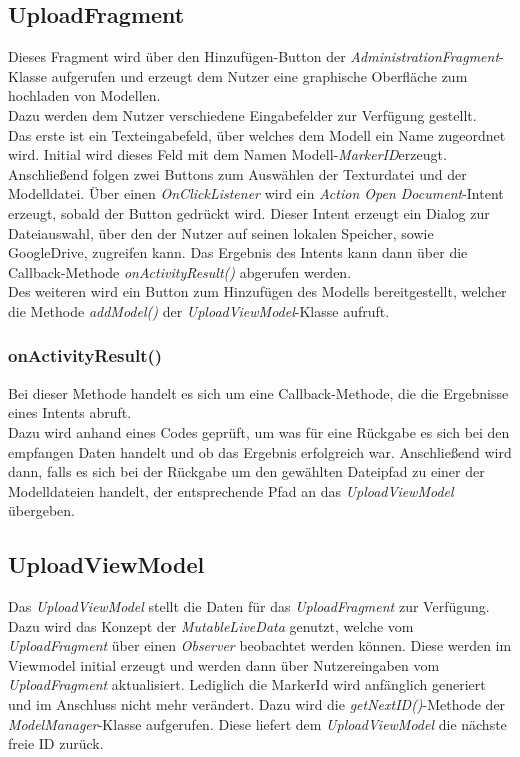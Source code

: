 \subsection{UploadFragment}
Dieses Fragment wird über den Hinzufügen-Button der \textit{AdministrationFragment}-Klasse aufgerufen und erzeugt dem Nutzer eine graphische Oberfläche zum hochladen von Modellen. \\
Dazu werden dem Nutzer verschiedene Eingabefelder zur Verfügung gestellt.\\
Das erste ist ein Texteingabefeld, über welches dem Modell ein Name zugeordnet wird. Initial wird dieses Feld mit dem Namen \glqq Modell-\textit{MarkerID}\grqq erzeugt.\\
Anschließend folgen zwei Buttons zum Auswählen der Texturdatei und der Modelldatei. Über einen \textit{OnClickListener} wird ein \textit{Action Open Document}-Intent erzeugt, sobald der Button gedrückt wird. Dieser Intent erzeugt ein Dialog zur Dateiauswahl, über den der Nutzer auf seinen lokalen Speicher, sowie GoogleDrive, zugreifen kann. Das Ergebnis des Intents kann dann über die Callback-Methode \textit{onActivityResult()} abgerufen werden. \\
Des weiteren wird ein Button zum Hinzufügen des Modells bereitgestellt, welcher die Methode \textit{addModel()} der \textit{UploadViewModel}-Klasse aufruft.

\subsubsection{onActivityResult()}
Bei dieser Methode handelt es sich um eine Callback-Methode, die die Ergebnisse eines Intents abruft.\\
Dazu wird anhand eines Codes geprüft, um was für eine Rückgabe es sich bei den empfangen Daten handelt und ob das Ergebnis erfolgreich war. 
Anschließend wird dann, falls es sich bei der Rückgabe um den gewählten Dateipfad zu einer der Modelldateien handelt, der entsprechende Pfad an das \textit{UploadViewModel} übergeben.

\subsection{UploadViewModel}
Das \textit{UploadViewModel} stellt die Daten für das \textit{UploadFragment} zur Verfügung. Dazu wird das Konzept der \textit{MutableLiveData} genutzt, welche vom \textit{UploadFragment} über einen \textit{Observer} beobachtet werden können. Diese werden im Viewmodel initial erzeugt und werden dann über Nutzereingaben vom \textit{UploadFragment} aktualisiert. Lediglich die MarkerId wird anfänglich generiert und im Anschluss nicht mehr verändert. Dazu wird die \textit{getNextID()}-Methode der \textit{ModelManager}-Klasse aufgerufen. Diese liefert dem \textit{UploadViewModel} die nächste freie ID zurück.

